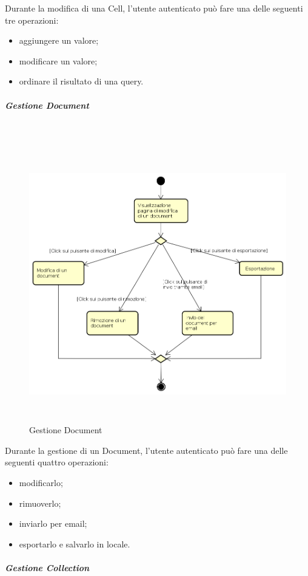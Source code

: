 Durante la modifica di una Cell, l'utente autenticato può fare una delle seguenti tre operazioni:
\begin{itemize}
\item aggiungere un valore;
\item modificare un valore;
\item ordinare il risultato di una query.
\end{itemize}
\newpage
\subparagraph{Gestione Document} \mbox{} \\
\begin{figure}[H]
\begin{center}
\includegraphics[height=12cm]{res/sections/backend/activities/modificaDocument.png}
\caption{Gestione Document}
\end{center}
\end{figure}
Durante la gestione di un Document, l'utente autenticato può fare una delle seguenti quattro operazioni:
\begin{itemize}
\item modificarlo;
\item rimuoverlo;
\item inviarlo per email;
\item esportarlo e salvarlo in locale.
\end{itemize}
\newpage
\subparagraph{Gestione Collection} \mbox{} \\
